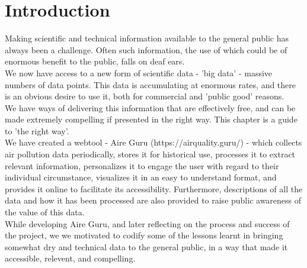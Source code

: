 \newpage
\section{Introduction}

Making scientific and technical information available to the general public has always been a challenge.
Often such information, the use of which could be of enormous benefit to the public, falls on deaf ears.\\

We now have access to a new form of scientific data - 'big data' - massive numbers of data points.
This data is accumulating at enormous rates, and there is an obvious desire to use it, both for
commercial and 'public good' reasons.\\

We have ways of delivering this information that are effectively free, and can be made extremely compelling
if presented in the right way. This chapter is a guide to 'the right way'.\\

We have created a webtool - Aire Guru (https://airquality.guru/) - which collects air pollution data periodically, stores it for historical use, 
processes it to extract relevant information, personalizes it to engage the user with regard to their individual
circumstance, visualizes it in an easy to understand format, and provides it online to facilitate its accessibility. Furthermore,
descriptions of all the data and how it has been processed are also provided to raise public awareness of the value
of this data.\\

While developing Aire Guru, and later reflecting on the process and success of the project, we we motivated to codify
some of the lessons learnt in bringing somewhat dry and technical data to the general public, in a way that made it 
accessible, relevent, and compelling.\\

